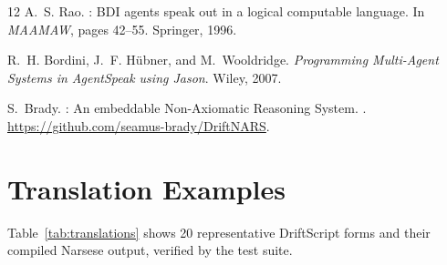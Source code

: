 \documentclass[11pt,a4paper]{article}
\begin{document}
\begin{thebibliography}{12}
A.~S. Rao.
: {BDI} agents speak out in a logical computable
  language.
\newblock In \emph{MAAMAW}, pages 42--55. Springer, 1996.

R.~H. Bordini, J.~F. H{\"u}bner, and M.~Wooldridge.
\newblock \emph{Programming Multi-Agent Systems in {AgentSpeak} using {Jason}}.
\newblock Wiley, 2007.

S.~Brady.
: An embeddable {Non-Axiomatic Reasoning System}.
.
\newblock \url{https://github.com/seamus-brady/DriftNARS}.

\end{thebibliography}

\appendix
\section{Translation Examples}
\label{app:translations}

Table~\ref{tab:translations} shows 20 representative DriftScript forms and
their compiled Narsese output, verified by the test suite.
\end{document}
